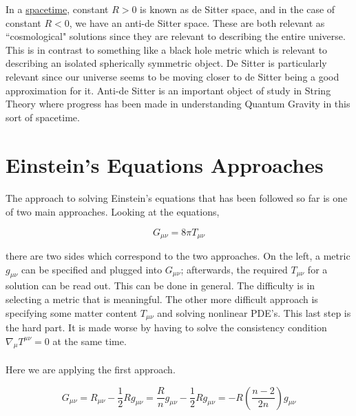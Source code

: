 \documentclass[10pt]{article}
\begin{document}
    In a \underline{spacetime}, constant $R>0$ is known as de Sitter space, and in the case of constant $R<0$, we have an anti-de Sitter space. These are both relevant as ``cosmological" solutions since they are relevant to describing the entire universe. This is in contrast to something like a black hole metric which is relevant to describing an isolated spherically symmetric object. De Sitter is particularly relevant since our universe seems to be moving closer to de Sitter being a good approximation for it. Anti-de Sitter is an important object of study in String Theory where progress has been made in understanding Quantum Gravity in this sort of spacetime.
    
    \section{Einstein's Equations Approaches} 
    \paragraph{}The approach to solving Einstein's equations that has been followed so far is one of two main approaches. Looking at the equations,
    
    \begin{equation}
        {G}_{\mu\nu} = 8\pi {T}_{\mu\nu}
    \end{equation}
    
    \noindent there are two sides which correspond to the two approaches. On the left, a metric ${g}_{\mu\nu}$ can be specified and plugged into ${G}_{\mu\nu}$; afterwards, the required ${T}_{\mu\nu}$ for a solution can be read out. This can be done in general. The difficulty is in selecting a metric that is meaningful. The other more difficult approach is specifying some matter content ${T}_{\mu\nu}$ and solving nonlinear PDE's. This last step is the hard part. It is made worse by having to solve the consistency condition ${\nabla}_{\mu}{T}^{\mu\nu} = 0$ at the same time. 
    
    \paragraph{}Here we are applying the first approach. 
    
    \begin{equation}
        {G}_{\mu\nu} = {R}_{\mu\nu} - \frac{1}{2}R{g}_{\mu\nu} = \frac{R}{n}{g}_{\mu\nu} - \frac{1}{2}R{g}_{\mu\nu} = -R(\frac{n-2}{2n}){g}_{\mu\nu}
    \end{equation}
    
\end{document}
